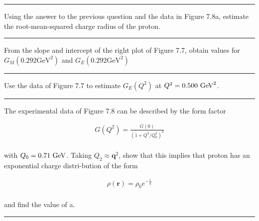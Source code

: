 \noindent\rule{7in}{1.5pt}


\begin{problem}{7.5}
    Using the answer to the previous question and the data in Figure 7.8a, estimate the root-mean-squared charge
    radius of the proton.
\end{problem}
\begin{solution}

\end{solution}

\noindent\rule{7in}{1.5pt}


\begin{problem}{7.6}
    From the slope and intercept of the right plot of Figure 7.7, obtain values for $G_M(0.292\text{GeV}^2 )$ and
    $G_E(0.292\text{GeV}^2)$
\end{problem}
\begin{solution}

\end{solution}

\noindent\rule{7in}{1.5pt}


\begin{problem}{7.7}
    Use the data of Figure 7.7 to estimate $G_E (Q^2 )$ at $Q^2 = 0.500 \text{ GeV}^2 $.
\end{problem}
\begin{solution}

\end{solution}

\noindent\rule{7in}{1.5pt}


\begin{problem}{7.8}
    The experimental data of Figure 7.8 can be described by the form factor

    \begin{align*}
        G(Q^2)= \frac{G(0)}{\left( 1+Q^2/Q_0^2 \right)^2}
    \end{align*}\\
    with $Q_0 = 0.71 \text{ GeV}$. Taking $Q_2 \approx \mathbf{q}^2$, show that this implies that proton has an exponential charge distri-bution of the form

    \begin{align*}
        \rho(\mathbf{r}) = \rho_0 e^{-\frac{r}{a}}
    \end{align*}\\
    and find the value of a.
\end{problem}
\begin{solution}

\end{solution}

\noindent\rule{7in}{1.5pt}

